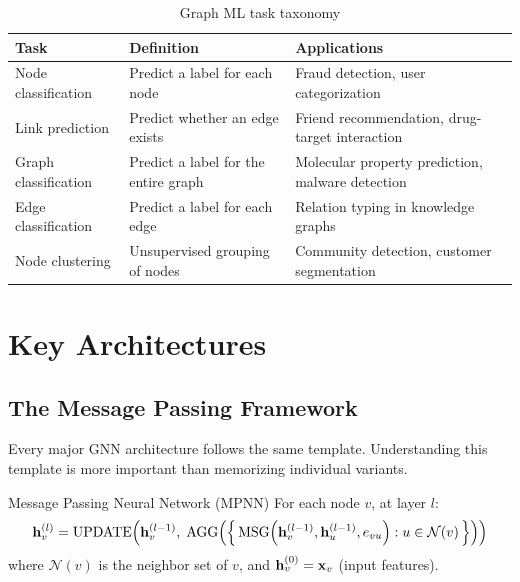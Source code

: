 \begin{table}[H]
\centering
\caption{Graph ML task taxonomy}
\begin{tabularx}{\textwidth}{lXX}
\toprule
\textbf{Task} & \textbf{Definition} & \textbf{Applications} \\
\midrule
Node classification & Predict a label for each node & Fraud detection, user categorization \\
Link prediction & Predict whether an edge exists & Friend recommendation, drug-target interaction \\
Graph classification & Predict a label for the entire graph & Molecular property prediction, malware detection \\
Edge classification & Predict a label for each edge & Relation typing in knowledge graphs \\
Node clustering & Unsupervised grouping of nodes & Community detection, customer segmentation \\
\bottomrule
\end{tabularx}
\end{table}

\section{Key Architectures}
\label{sec:gnn_architectures}

\subsection{The Message Passing Framework}

Every major GNN architecture follows the same template. Understanding this template is more important than memorizing individual variants.

\begin{mathresult}{Message Passing Neural Network (MPNN)}
For each node $v$, at layer $l$:
\begin{equation}
\mathbf{h}_v^{(l)} = \text{UPDATE}\!\left(\mathbf{h}_v^{(l-1)},\; \text{AGG}\!\left(\left\{\,\text{MSG}\!\left(\mathbf{h}_v^{(l-1)}, \mathbf{h}_u^{(l-1)}, e_{vu}\right) : u \in \mathcal{N}(v)\,\right\}\right)\right)
\label{eq:mpnn}
\end{equation}
where $\mathcal{N}(v)$ is the neighbor set of $v$, and $\mathbf{h}_v^{(0)} = \mathbf{x}_v$ (input features).
\end{mathresult}


